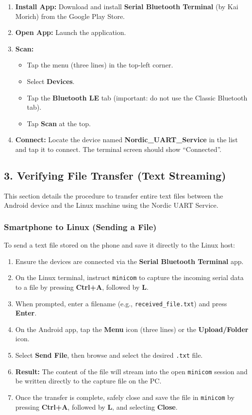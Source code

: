 \documentclass[conference]{IEEEtran}
\begin{document}
\begin{enumerate}
    \item \textbf{Install App:} Download and install \textbf{Serial Bluetooth Terminal} (by Kai Morich) from the Google Play Store.
    \item \textbf{Open App:} Launch the application.
    \item \textbf{Scan:}
    \begin{itemize}
        \item Tap the menu (three lines) in the top-left corner.
        \item Select \textbf{Devices}.
        \item Tap the \textbf{Bluetooth LE} tab (important: do not use the Classic Bluetooth tab).
        \item Tap \textbf{Scan} at the top.
    \end{itemize}
    \item \textbf{Connect:} Locate the device named \textbf{Nordic\_UART\_Service} in the list and tap it to connect. The terminal screen should show ``Connected''.
\end{enumerate}

\subsection{3. Verifying File Transfer (Text Streaming)} \label{text}

This section details the procedure to transfer entire text files between the Android device and the Linux machine using the Nordic UART Service.

\subsubsection{Smartphone to Linux (Sending a File)}
To send a text file stored on the phone and save it directly to the Linux host:
\begin{enumerate}
  \item Ensure the devices are connected via the \textbf{Serial Bluetooth Terminal} app.
  \item On the Linux terminal, instruct \texttt{minicom} to capture the incoming serial data to a file by pressing \textbf{Ctrl+A}, followed by \textbf{L}.
 \item When prompted, enter a filename (e.g., \texttt{received\_file.txt}) and press \textbf{Enter}.
 \item On the Android app, tap the \textbf{Menu} icon (three lines) or the \textbf{Upload/Folder} icon.
  \item Select \textbf{Send File}, then browse and select the desired \texttt{.txt} file.
  \item \textbf{Result:} The content of the file will stream into the open \texttt{minicom} session and be written directly to the capture file on the PC.
  \item Once the transfer is complete, safely close and save the file in \texttt{minicom} by pressing \textbf{Ctrl+A}, followed by \textbf{L}, and selecting \textbf{Close}.
\end{enumerate}
\end{document}
